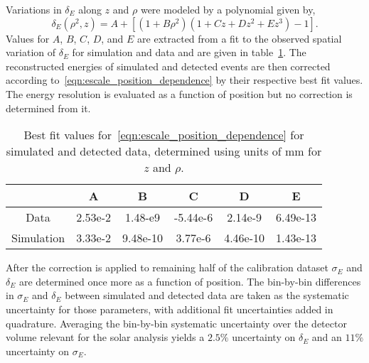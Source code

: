 Variations in $\delta_{E}$ along $z$ and $\rho$ were modeled by a polynomial given by,
\begin{equation}
    \delta_{E}(\rho^{2}, z) = A + \left[(1+B\rho^{2})(1+Cz+Dz^{2}+Ez^{3}) - 1\right]\text{.}
    \label{eqn:escale_position_dependence}
\end{equation}
Values for $A$, $B$, $C$, $D$, and $E$ are extracted from a fit to the observed
spatial variation of $\delta_{E}$ for simulation and data and are given in
table~\ref{tbl:n16_position_escale}. The reconstructed energies of simulated and detected 
events are then corrected according to~\eqref{eqn:escale_position_dependence} by
their respective best fit values.
The energy resolution is evaluated as a function of position but no correction
is determined from it.
\begin{table}
    \centering
\begin{tabular}{|c | c | c | c |c|c|}
    \hline
    & A&B&C&D&E\\
    \hline
    Data& 2.53e-2& 1.48-e9 & -5.44e-6 & 2.14e-9 & 6.49e-13\\
    Simulation& 3.33e-2& 9.48e-10& 3.77e-6& 4.46e-10& 1.43e-13\\
    \hline
\end{tabular}
    \caption{Best fit values for~\eqref{eqn:escale_position_dependence} for
    simulated and detected data, determined using units of mm for $z$ and $\rho$.}
    \label{tbl:n16_position_escale}
\end{table}


After the correction is applied to remaining half of the calibration dataset
$\sigma_{E}$ and $\delta_{E}$ are determined once more as a function of position.
The bin-by-bin differences in $\sigma_{E}$ and $\delta_{E}$ between
simulated and detected data are taken as the systematic uncertainty for those
parameters, with additional fit uncertainties added in quadrature.
Averaging the bin-by-bin systematic uncertainty over the detector volume relevant
for the solar analysis yields a $2.5\%$ uncertainty on $\delta_{E}$ and an
$11\%$ uncertainty on $\sigma_{E}$.


